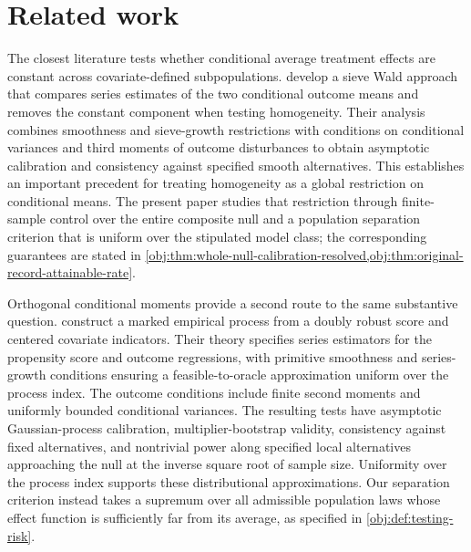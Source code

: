 \section{Related work}

The closest literature tests whether conditional average treatment effects are constant across covariate-defined subpopulations. \citet[Section III]{CrumpHotzImbensMitnik2008Homogeneity} develop a sieve Wald approach that compares series estimates of the two conditional outcome means and removes the constant component when testing homogeneity. Their analysis combines smoothness and sieve-growth restrictions with conditions on conditional variances and third moments of outcome disturbances to obtain asymptotic calibration and consistency against specified smooth alternatives. This establishes an important precedent for treating homogeneity as a global restriction on conditional means. The present paper studies that restriction through finite-sample control over the entire composite null and a population separation criterion that is uniform over the stipulated model class; the corresponding guarantees are stated in \cref{obj:thm:whole-null-calibration-resolved,obj:thm:original-record-attainable-rate}.

Orthogonal conditional moments provide a second route to the same substantive question. \citet[Assumptions 1--5, Proposition 2, and Theorems 3.1--3.3 and 4.1]{LuSong2026OrthogonalICM} construct a marked empirical process from a doubly robust score and centered covariate indicators. Their theory specifies series estimators for the propensity score and outcome regressions, with primitive smoothness and series-growth conditions ensuring a feasible-to-oracle approximation uniform over the process index. The outcome conditions include finite second moments and uniformly bounded conditional variances. The resulting tests have asymptotic Gaussian-process calibration, multiplier-bootstrap validity, consistency against fixed alternatives, and nontrivial power along specified local alternatives approaching the null at the inverse square root of sample size. Uniformity over the process index supports these distributional approximations. Our separation criterion instead takes a supremum over all admissible population laws whose effect function is sufficiently far from its average, as specified in \cref{obj:def:testing-risk}.

